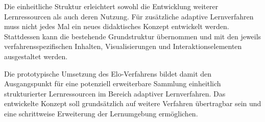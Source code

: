 Die einheitliche Struktur erleichtert sowohl die Entwicklung weiterer
Lernressourcen als auch deren Nutzung. Für zusätzliche adaptive
Lernverfahren muss nicht jedes Mal ein neues didaktisches Konzept
entwickelt werden. Stattdessen kann die bestehende Grundstruktur
übernommen und mit den jeweils verfahrensspezifischen Inhalten,
Visualisierungen und Interaktionselementen ausgestaltet werden.

Die prototypische Umsetzung des Elo-Verfahrens bildet damit den
Ausgangspunkt für eine potenziell erweiterbare Sammlung einheitlich
strukturierter Lernressourcen im Bereich adaptiver Lernverfahren. Das
entwickelte Konzept soll grundsätzlich auf weitere Verfahren übertragbar
sein und eine schrittweise Erweiterung der Lernumgebung ermöglichen.
